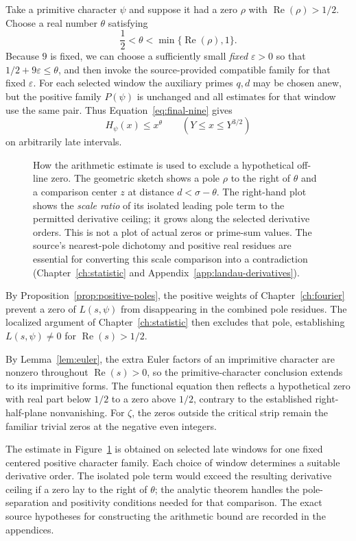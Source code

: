 \documentclass[11pt,openany,oneside]{scrbook}
\theoremstyle{definition}
\theoremstyle{remark}
\newcommand{\Rea}{\operatorname{Re}}
\newcommand{\eps}{\varepsilon}
\begin{document}
Take a primitive character $\psi$ and suppose it had a zero $\rho$ with $\Rea(\rho)>1/2$.  Choose a real number $\theta$ satisfying
\[
\frac12<\theta<\min\{\Rea(\rho),1\}.
\]
Because $9$ is fixed, we can choose a sufficiently small \emph{fixed} $\eps>0$ so that $1/2+9\eps\le\theta$, and then invoke the source-provided compatible family for that fixed $\eps$. For each selected window the auxiliary primes $q,d$ may be chosen anew, but the positive family $P(\psi)$ is unchanged and all estimates for that window use the same pair. Thus Equation~\eqref{eq:final-nine} gives
\[
H_\psi(x)\le x^\theta
\qquad (Y\le x\le Y^{3/2})
\]
on arbitrarily late intervals.

\begin{figure}[H]
\centering

\caption{How the arithmetic estimate is used to exclude a hypothetical off-line zero. The geometric sketch shows a pole $\rho$ to the right of $\theta$ and a comparison center $z$ at distance $d<\sigma-\theta$. The right-hand plot shows the \emph{scale ratio} of its isolated leading pole term to the permitted derivative ceiling; it grows along the selected derivative orders. This is not a plot of actual zeros or prime-sum values. The source's nearest-pole dichotomy and positive real residues are essential for converting this scale comparison into a contradiction (Chapter~\ref{ch:statistic} and Appendix~\ref{app:landau-derivatives}).}
\label{fig:final-chain}
\end{figure}

By Proposition~\ref{prop:positive-poles}, the positive weights of Chapter~\ref{ch:fourier} prevent a zero of $L(s,\psi)$ from disappearing in the combined pole residues. The localized argument of Chapter~\ref{ch:statistic} then excludes that pole, establishing $L(s,\psi)\ne0$ for $\Rea(s)>1/2$.

By Lemma~\ref{lem:euler}, the extra Euler factors of an imprimitive character are nonzero throughout $\Rea(s)>0$, so the primitive-character conclusion extends to its imprimitive forms. The functional equation then reflects a hypothetical zero with real part below $1/2$ to a zero above $1/2$, contrary to the established right-half-plane nonvanishing. For $\zeta$, the zeros outside the critical strip remain the familiar trivial zeros at the negative even integers.



The estimate in Figure~\ref{fig:final-chain} is obtained on selected late windows for one fixed centered positive character family. Each choice of window determines a suitable derivative order. The isolated pole term would exceed the resulting derivative ceiling if a zero lay to the right of $\theta$; the analytic theorem handles the pole-separation and positivity conditions needed for that comparison. The exact source hypotheses for constructing the arithmetic bound are recorded in the appendices.
\end{document}
